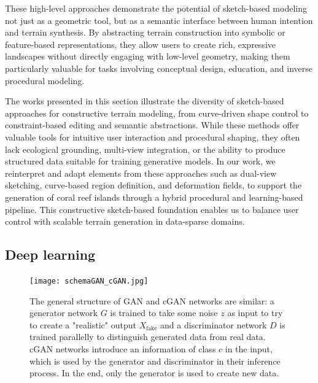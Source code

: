 These high-level approaches demonstrate the potential of sketch-based modeling not just as a geometric tool, but as a semantic interface between human intention and terrain synthesis. By abstracting terrain construction into symbolic or feature-based representations, they allow users to create rich, expressive landscapes without directly engaging with low-level geometry, making them particularly valuable for tasks involving conceptual design, education, and inverse procedural modeling.

\midConclusion

The works presented in this section illustrate the diversity of sketch-based approaches for constructive terrain modeling, from curve-driven shape control to constraint-based editing and semantic abstractions. While these methods offer valuable tools for intuitive user interaction and procedural shaping, they often lack ecological grounding, multi-view integration, or the ability to produce structured data suitable for training generative models. In our work, we reinterpret and adapt elements from these approaches such as dual-view sketching, curve-based region definition, and deformation fields, to support the generation of coral reef islands through a hybrid procedural and learning-based pipeline. This constructive sketch-based foundation enables us to balance user control with scalable terrain generation in data-sparse domains.



\subsection{Deep learning}
\label{sec:coral-island-sota-deep-learning}

\begin{figure}[H]
	\centering
	\texttt{[image: schemaGAN\_cGAN.jpg]}
    \caption{The general structure of GAN and cGAN networks are similar: a generator network $G$ is trained to take some noise $z$ as input to try to create a "realistic" output $X_{\text{fake}}$ and a discriminator network $D$ is trained parallelly to distinguish generated data from real data. cGAN networks introduce an information of class $c$ in the input, which is used by the generator and discriminator in their inference process. In the end, only the generator is used to create new data. }
    \label{fig:coral-island-GAN-scheme}
\end{figure}

